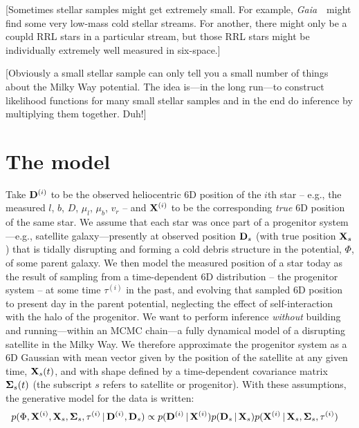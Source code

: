\documentclass[letterpaper,12pt,preprint]{aastex}
\newcommand{\project}[1]{\textsl{#1}}
\newcommand{\gaia}{\project{Gaia}~}
\newcommand{\given}{\,|\,}
\newcommand{\D}{{\bf D}}
\newcommand{\X}{{\bf X}}
\newcommand{\bSigma}{{\bf \Sigma}}
\begin{document}
[Sometimes stellar samples might get extremely small.  For example,
  \gaia\ might find some very low-mass cold stellar streams.  For
  another, there might only be a coupld RRL stars in a particular
  stream, but those RRL stars might be individually extremely well
  measured in six-space.]

[Obviously a small stellar sample can only tell you a small number of
  things about the Milky Way potential.  The idea is---in the long
  run---to construct likelihood functions for many small stellar
  samples and in the end do inference by multiplying them together.
  Duh!]

\section{The model}

Take ${\bf D}^{(i)}$ to be the observed heliocentric 6D position of the $i$th star -- e.g., the measured $l$, $b$, $D$, $\mu_l$, $\mu_b$, $v_r$ -- and ${\bf X}^{(i)}$ to be the corresponding \emph{true} 6D position of the same star. We assume that each star was once part of a progenitor system---e.g., satellite galaxy---presently at observed position ${\bf D}_s$ (with true position ${\bf X}_s$) that is tidally disrupting and forming a cold debris structure in the potential, $\Phi$, of some parent galaxy. We then model the measured position of a star today as the result of sampling from a time-dependent 6D distribution -- the progenitor system -- at some time $\tau^{(i)}$ in the past, and evolving that sampled 6D position to present day in the parent potential, neglecting the effect of self-interaction with the halo of the progenitor. We want to perform inference \emph{without} building and running---within an MCMC chain---a fully dynamical model of a disrupting satellite in the Milky Way. We therefore approximate the progenitor system as a 6D Gaussian with mean vector given by the position of the satellite at any given time, ${\bf X}_s(t)$, and with shape defined by a time-dependent covariance matrix $\bSigma_s(t)$ (the subscript $s$ refers to satellite or progenitor). With these assumptions, the generative model for the data is written:
\begin{align}
	p(\Phi, \X^{(i)}, \X_s, \bSigma_s, \tau^{(i)} \given \D^{(i)}, \D_s) &\propto 
		p(\D^{(i)} \given \X^{(i)}) p(\D_s \given \X_s) p(\X^{(i)} \given \X_s, \bSigma_s, \tau^{(i)})
\end{align}
\end{document}
